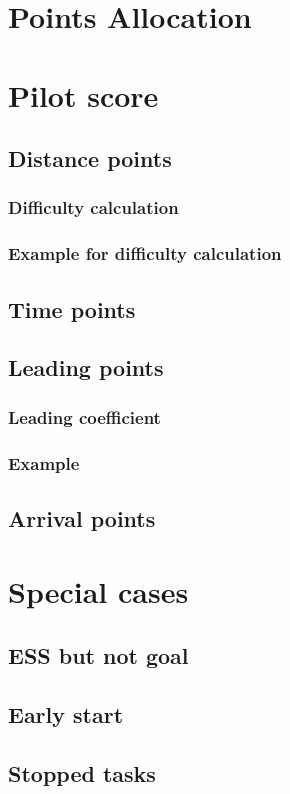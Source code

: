 \documentclass{article}
\begin{document}
\newpage
\section{Points Allocation}

\newpage
\section{Pilot score}
\subsection{Distance points}
\subsubsection{Difficulty calculation}
\subsubsection{Example for difficulty calculation}
\subsection{Time points}
\subsection{Leading points}
\subsubsection{Leading coefficient}
\subsubsection{Example}
\subsection{Arrival points}

\newpage
\section{Special cases}
\subsection{ESS but not goal}
\subsection{Early start}
\subsection{Stopped tasks}
\end{document}
